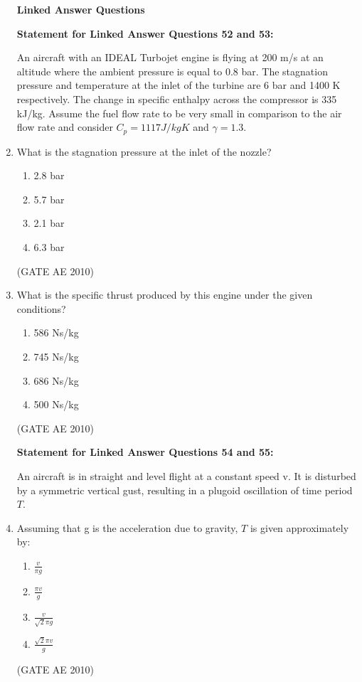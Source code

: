 \documentclass[journal]{IEEEtran}
\begin{document}
\begin{enumerate}
\textbf{Linked Answer Questions}

\textbf{Statement for Linked Answer Questions 52 and 53:}

    An aircraft with an IDEAL Turbojet engine is flying at 200 m/s at an altitude where the ambient pressure is equal to 0.8 bar. The stagnation pressure and temperature at the inlet of the turbine are 6 bar and 1400 K respectively. The change in specific enthalpy across the compressor is 335 kJ/kg. Assume the fuel flow rate to be very small in comparison to the air flow rate and consider $ C_p = 1117  J/kgK $ and $ \gamma = 1.3 $.
    
\item What is the stagnation pressure at the inlet of the nozzle?
\begin{multicols}{4}
\begin{enumerate}
\item 2.8 bar
\item 5.7 bar
\item 2.1 bar
\item 6.3 bar
\end{enumerate}
\end{multicols}
\hfill (GATE AE 2010)

\item What is the specific thrust produced by this engine under the given conditions?
\begin{multicols}{4}
\begin{enumerate}
\item 586 Ns/kg
\item 745 Ns/kg
\item 686 Ns/kg
\item 500 Ns/kg
\end{enumerate}
\end{multicols}
\hfill (GATE AE 2010)

\textbf{Statement for Linked Answer Questions 54 and 55:}

    An aircraft is in straight and level flight at a constant speed v. It is disturbed by a symmetric vertical gust, resulting in a plugoid oscillation of time period $ T $.
    
\item Assuming that g is the acceleration due to gravity, $ T $ is given approximately by:
\begin{multicols}{4}
\begin{enumerate}
\item $ \frac{v}{\pi g} $
\item $ \frac{\pi v}{g} $
\item $ \frac{v}{\sqrt{2}\pi g} $
\item $ \frac{\sqrt{2}\pi v}{g} $
\end{enumerate}
\end{multicols}
\hfill (GATE AE 2010)


\end{enumerate}
\end{document}
